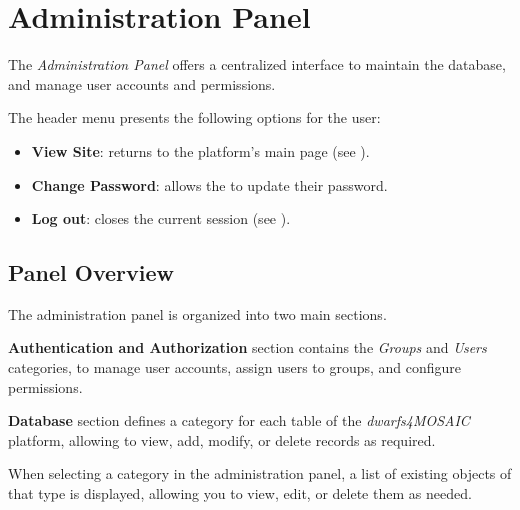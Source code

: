 
\chapter{Administration Panel} \label{chap:admin-panel}

The \textsl{Administration Panel} offers a centralized interface to maintain the database, and manage user accounts and permissions. 

The header menu presents the following options for the \admin user:

\begin{itemize}
	\item \textbf{View Site}: returns to the platform’s main page (see ).
	\item \textbf{Change Password}: allows the \admin to update their password.
	\item \textbf{Log out}: closes the current session (see ).
\end{itemize}



\section{Panel Overview} \label{sec:admin-panel-overview}

The administration panel is organized into two main sections.

\textbf{Authentication and Authorization} section contains the \textsl{Groups} and \textsl{Users} categories, to manage user accounts, assign users to groups, and configure permissions.
	
	
\textbf{Database} section defines a category for each table of the \textsl{dwarfs4MOSAIC} platform, allowing to view, add, modify, or delete records as required.
	
	

When selecting a category in the administration panel, a list of existing objects of that type is displayed, allowing you to view, edit, or delete them as needed.

